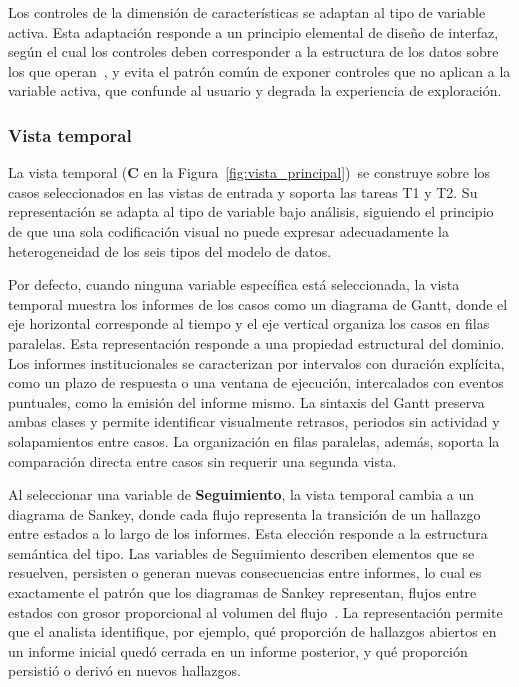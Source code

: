 Los controles de la dimensión de características se 
adaptan al tipo de variable activa. Esta adaptación responde a un 
principio elemental de diseño de interfaz, según el cual 
los controles deben corresponder a la estructura de los 
datos sobre los que 
operan~\cite{shneiderman1996tasks}, y evita el patrón 
común de exponer controles que no aplican a la variable 
activa, que confunde al usuario y degrada la experiencia 
de exploración.

\subsubsection{Vista temporal}

La vista temporal (\textbf{C} en la 
Figura~\ref{fig:vista_principal})~se construye sobre los 
casos seleccionados en las vistas de entrada y soporta 
las tareas T1 y T2. Su representación se adapta al tipo 
de variable bajo análisis, siguiendo el principio de que 
una sola codificación visual no puede expresar 
adecuadamente la heterogeneidad de los seis tipos del 
modelo de datos.

Por defecto, cuando ninguna variable específica está 
seleccionada, la vista temporal muestra los informes de 
los casos como un diagrama de Gantt, donde el eje 
horizontal corresponde al tiempo y el eje vertical 
organiza los casos en filas paralelas. Esta 
representación responde a una propiedad estructural del 
dominio. Los informes institucionales se caracterizan 
por intervalos con duración explícita, como un plazo de 
respuesta o una ventana de ejecución, intercalados con 
eventos puntuales, como la emisión del informe mismo. 
La sintaxis del Gantt preserva ambas clases y permite 
identificar visualmente retrasos, periodos sin actividad 
y solapamientos entre casos. La organización en filas 
paralelas, además, soporta la comparación directa entre 
casos sin requerir una segunda vista.

Al seleccionar una variable de \textbf{Seguimiento}, la 
vista temporal cambia a un diagrama de Sankey, donde 
cada flujo representa la transición de un hallazgo entre 
estados a lo largo de los informes. Esta elección 
responde a la estructura semántica del tipo. Las 
variables de Seguimiento describen elementos que se 
resuelven, persisten o generan nuevas consecuencias 
entre informes, lo cual es exactamente el patrón que 
los diagramas de Sankey representan, flujos entre 
estados con grosor proporcional al volumen del 
flujo~\cite{riehmann2005sankey}. La representación 
permite que el analista identifique, por ejemplo, qué 
proporción de hallazgos abiertos en un informe inicial 
quedó cerrada en un informe posterior, y qué proporción 
persistió o derivó en nuevos hallazgos.

